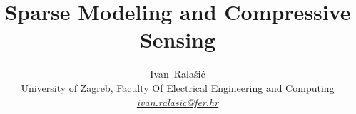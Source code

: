 \documentclass[journal]{IEEEtran}
\begin{document}
%
\title{Sparse Modeling and Compressive Sensing}
%
%
%

\author{Ivan~Ralašić\\ University of Zagreb, Faculty Of Electrical Engineering and Computing\\ \href{mailto:ivan.ralasic@fer.hr}{\textit{ivan.ralasic@fer.hr}}}%


% 
%



% 
\end{document}
